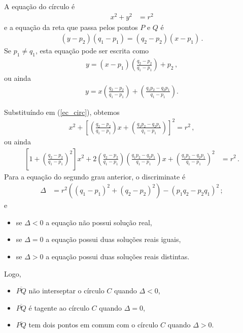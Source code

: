 A equação do círculo é
\begin{align}
    x^2 + y^2 &= r^2
    \label{ec_circ}
\end{align}
e a equação da reta que passa pelos pontos $P$ e $Q$ é
\begin{align*}
    (y-p_2)(q_1-p_1)=(q_2-p_2)(x-p_1)\,.
\end{align*}
Se $p_1\neq q_1$, esta equação pode ser escrita como
\begin{align*}
    y=(x-p_1)\left(\frac{q_2-p_2}{q_1-p_1}\right)+p_2\,,
\end{align*}
ou ainda
\begin{align*}
    y = x\left( \frac{q_2 - p_2}{q_1 - p_1} \right) + \left(
    \frac{q_1 p_2 - q_2 p_1}{q_1 - p_1} \right).
\end{align*}

Substituíndo em (\ref{ec_circ}), obtemos
\begin{align*}
    x^2  + \left[ \left( \frac{q_2 - p_2}{q_1 - p_1} \right) x + \left(
    \frac{q_1 p_2 - q_2 p_1}{q_1 - p_1} \right) \right]^2  = r^2\,,
\end{align*}
ou ainda
\begin{align*}
    \left[ 1 + \left( \frac{q_2 - p_2}{q_1 - p_1} \right)^2 \right] x^2 +
    2 \left( \frac{q_2 - p_2}{q_1 - p_1} \right) \left( \frac{q_1 p_2 - q_2
    p_1}{q_1 - p_1} \right) x + \left( 
    \frac{q_1 p_2 - q_2 p_1}{q_1 - p_1} \right)^2 & = r^2\,.
\end{align*}
Para a equação do segundo grau anterior, o discriminate é
\begin{align*}
    \Delta &= r^2 \left( \left( q_1 - p_1 \right)^2 + \left( q_2 - p_2
    \right)^2 \right) - \left( p_1 q_2 - p_2 q_1 \right)^2\,;
\end{align*}
e
\begin{itemize}
    \item se $\Delta < 0$ a equação não possui solução real,
    \item se $\Delta = 0$ a equação possui duas soluções reais iguais,
    \item se $\Delta > 0$ a equação possui duas soluções reais distintas.
\end{itemize}
Logo,
\begin{itemize}
    \item $\overline{PQ}$ não interseptar o círculo $C$ quando $\Delta < 0$,
    \item $\overline{PQ}$ é tagente ao círculo $C$ quando $\Delta = 0$,
    \item $\overline{PQ}$ tem dois pontos em comum com o círculo $C$ quando
        $\Delta > 0$.
\end{itemize}
